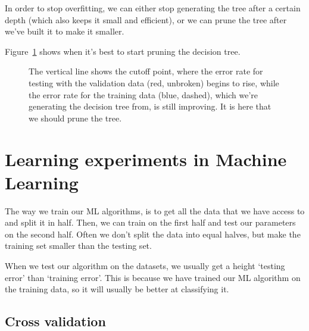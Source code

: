 In order to stop overfitting, we can either stop generating the tree after a
certain depth (which also keeps it small and efficient), or we can prune the
tree after we've built it to make it smaller.

Figure~\ref{fig:overfitting} shows when it's best to start pruning the decision
tree.

\begin{figure}[!h]
  \centering
  \caption{The vertical line shows the cutoff point, where the error rate for
  testing with the validation data (red, unbroken) begins to rise, while the
  error rate for the training data (blue, dashed), which we're generating the
  decision tree from, is still improving. It is here that we should prune the
  tree.}
  \label{fig:overfitting}
\end{figure}

\section{Learning experiments in Machine Learning}

The way we train our ML algorithms, is to get all the data that we have access
to and split it in half. Then, we can train on the first half and test our
parameters on the second half. Often we don't split the data into equal halves,
but make the training set smaller than the testing set.

When we test our algorithm on the datasets, we usually get a height `testing
error' than `training error'. This is because we have trained our ML algorithm
on the training data, so it will usually be better at classifying it.

\subsection{Cross validation}

